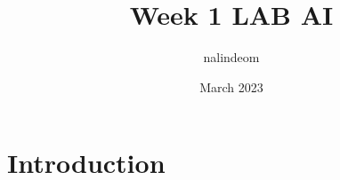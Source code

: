 \documentclass{article}
\title{Week 1 LAB AI}
\author{nalindeom }
\date{March 2023}
\begin{document}
\maketitle

\section{Introduction}
\end{document}
